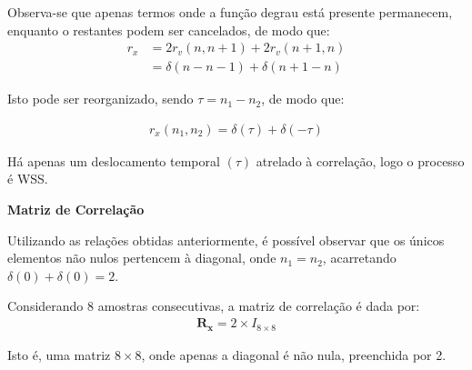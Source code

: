 Observa-se que apenas termos onde a função degrau está presente permanecem, enquanto o restantes podem ser cancelados, de modo que:
\begin{align*}
    r_{x} &= 2r_{v}(n,n+1) + 2r_{v}(n+1,n)\\
    &= \delta(n - n - 1) + \delta(n + 1 - n)
\end{align*}

Isto pode ser reorganizado, sendo $\tau = n_{1} - n_{2}$, de modo que:

\begin{align*}
    r_{x}(n_{1}, n_{2}) = \delta(\tau) + \delta(-\tau)
\end{align*}

Há apenas um deslocamento temporal $(\tau)$ atrelado à correlação, logo o processo é WSS.


\textbf{Matriz de Correlação}

Utilizando as relações obtidas anteriormente, é possível observar que os únicos elementos não nulos pertencem à diagonal, onde $n_{1}= n_{2}$, acarretando $\delta(0) + \delta(0) = 2$.

Considerando 8 amostras consecutivas, a matriz de correlação é dada por:
\begin{align*}
    \mathbf{R}_{\mathbf{x}} = 2 \times I_{8 \times 8}
\end{align*}

Isto é, uma matriz $8 \times 8$, onde apenas a diagonal é não nula, preenchida por 2.